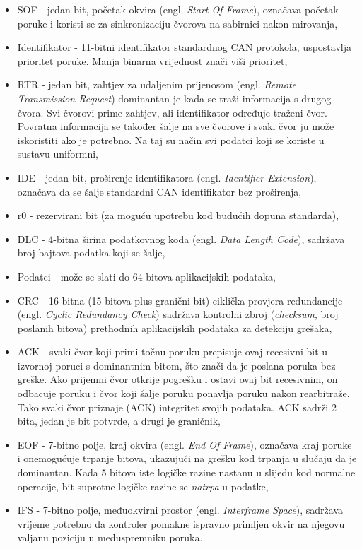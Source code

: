 \begin{itemize}
	\item SOF - jedan bit, početak okvira (engl. \textit{Start Of Frame}), označava početak poruke i koristi se za sinkronizaciju čvorova na sabirnici nakon mirovanja,
	\item Identifikator - 11-bitni identifikator standardnog CAN protokola, uspostavlja prioritet poruke. Manja binarna vrijednost znači viši prioritet,
	\item RTR - jedan bit, zahtjev za udaljenim prijenosom (engl. \textit{Remote Transmission Request}) dominantan je kada se traži informacija s drugog čvora. Svi čvorovi prime zahtjev, ali identifikator određuje traženi čvor. Povratna informacija se također šalje na sve čvorove i svaki čvor ju može iskoristiti ako je potrebno. Na taj su način svi podatci koji se koriste u sustavu uniformni,
	\item IDE - jedan bit, proširenje identifikatora (engl. \textit{Identifier Extension}), označava da se šalje standardni CAN identifikator bez proširenja,
	\item r0 - rezervirani bit (za moguću upotrebu kod budućih dopuna standarda),
	\item DLC - 4-bitna širina podatkovnog koda (engl. \textit{Data Length Code}), sadržava broj bajtova podatka koji se šalje,
	\item Podatci - može se slati do 64 bitova aplikacijskih podataka,
	\item CRC - 16-bitna (15 bitova plus granični bit) ciklička provjera redundancije (engl. \textit{Cyclic Redundancy Check}) sadržava kontrolni zbroj (\textit{checksum}, broj poslanih bitova) prethodnih aplikacijskih podataka za detekciju grešaka,
	\item ACK - svaki čvor koji primi točnu poruku prepisuje ovaj recesivni bit u izvornoj poruci s dominantnim bitom, što znači da je poslana poruka bez greške. Ako prijemni čvor otkrije pogrešku i ostavi ovaj bit recesivnim, on odbacuje poruku i čvor koji šalje poruku ponavlja poruku nakon rearbitraže. Tako svaki čvor priznaje (ACK) integritet svojih podataka. ACK sadrži 2 bita, jedan je bit potvrde, a drugi je graničnik,
	\item EOF - 7-bitno polje, kraj okvira (engl. \textit{End Of Frame}), označava kraj poruke i onemogućuje trpanje bitova, ukazujući na grešku kod trpanja u slučaju da je dominantan. Kada 5 bitova iste logičke razine nastanu u slijedu kod normalne operacije, bit suprotne logičke razine se \textit{natrpa} u podatke,
	\item IFS - 7-bitno polje, međuokvirni prostor (engl. \textit{Interframe Space}), sadržava vrijeme potrebno da kontroler pomakne ispravno primljen okvir na njegovu valjanu poziciju u međuspremniku poruka.
\end{itemize}

